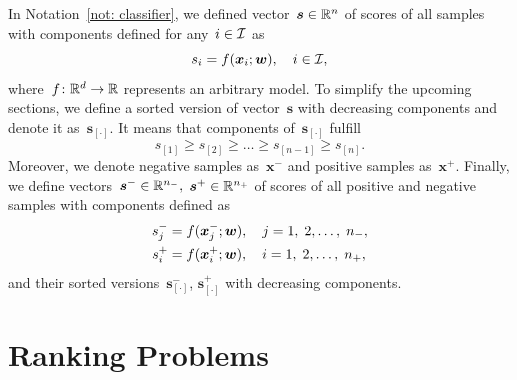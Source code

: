 \begin{notation}\label{not: scores}
  In Notation~\ref{not: classifier}, we defined vector~$\bm{s} \in \mathbb{R}^n$ of scores of all samples with components defined for any~$i \in \mathcal{I}$ as
  \begin{equation*}
    s_i = f(\bm{x}_i; \bm{w}), \quad i \in \mathcal{I},
  \end{equation*}
  where~$f \colon \mathbb{R}^d \to \mathbb{R}$ represents an arbitrary model. To simplify the upcoming sections, we define a sorted version of vector~$\bm{s}$ with decreasing components and denote it as~$\bm{s}_{[\cdot]}.$ It means that components of~$\bm{s}_{[\cdot]}$ fulfill
  \begin{equation*}
    s_{[1]}   \geq s_{[2]} \geq \dots \geq s_{[n - 1]} \geq s_{[n]}.
  \end{equation*}
  Moreover, we denote negative samples as~$\bm{x}^-$ and positive samples as~$\bm{x}^+.$ Finally, we define vectors~$\bm{s}^- \in \mathbb{R}^{n_{-}},$ $\bm{s}^+ \in \mathbb{R}^{n_{+}}$ of scores of all positive and negative samples with components defined as
  \begin{equation*}
    \begin{aligned}
      s^-_j & = f(\bm{x}^-_j; \bm{w}), \quad j = 1, \; 2, \ldots, \; n_{-}, \\
      s^+_i & = f(\bm{x}^+_i; \bm{w}), \quad i = 1, \; 2, \ldots, \; n_{+},
    \end{aligned}
  \end{equation*}
  and their sorted versions~$\bm{s}^-_{[\cdot]}$, $\bm{s}^+_{[\cdot]}$ with decreasing components.
\end{notation}

\section{Ranking Problems}\label{sec: ranking}

